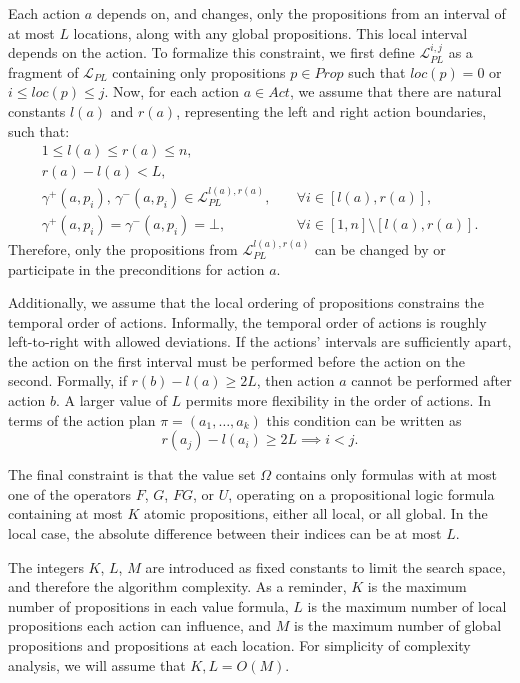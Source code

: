 \documentclass[]{jair}
\begin{document}
Each action $a$ depends on, and changes, only the propositions from an interval of at most $L$ locations,
along with any global propositions. This local interval depends on the action. 
To formalize this constraint, we first define $\mathcal{L}_{PL}^{i, j}$ as a fragment of $\mathcal{L}_{PL}$
containing only propositions $p\in Prop$ such that $loc(p)=0$ or $i\le loc(p)\le j$.
Now, for each action $a\in Act$, we assume that there are natural constants $l(a)$ and $r(a)$, representing the left and right action boundaries, such that: 
\begin{equation}
\begin{aligned}1\le l(a) \le r(a) \le n, \\ r(a)-l(a)< L,\\
\gamma^+(a, p_i),\,\gamma^-(a, p_i)\in \mathcal{L}_{PL}^{l(a), r(a)}, \quad & \forall i\in[l(a),r(a)],\\
\gamma^+(a, p_i)=\gamma^-(a, p_i)=\bot, \quad & \forall i\in [1,n]\setminus[l(a),r(a)].\end{aligned}\end{equation}
Therefore, only the propositions from $\mathcal{L}_{PL}^{l(a), r(a)}$ can be changed by or participate in the preconditions for action $a$.

Additionally, we assume that the local ordering of propositions constrains the temporal order of actions.
Informally, the temporal order of actions is roughly left-to-right with allowed deviations.
If the actions' intervals are sufficiently apart, the action on the first interval must be performed before the action on the second. Formally, if $r(b)-l(a)\ge 2L$, then action $a$ cannot be performed after action $b$.
A larger value of $L$ permits more flexibility in the order of actions.
In terms of the action plan $\pi = (a_1, \dots, a_k)$ this condition can be written as
\begin{equation}r(a_j)-l(a_i)\ge 2L \implies i<j.\label{k}\end{equation}

The final constraint is that the value set $\Omega$ contains only formulas with at most one of the operators
$F$, $G$, $FG$, or $U$, operating on a propositional logic formula containing at most $K$ atomic propositions, %
either all local, or all global. In the local case, the absolute difference between their indices can be at most $L$.

The integers $K$, $L$, $M$ are introduced as fixed constants to limit the search space,
and therefore the algorithm complexity. As a reminder,
$K$ is the maximum number of propositions in each value formula,
$L$ is the maximum number of local propositions each action can influence,
and $M$ is the maximum number of global propositions and propositions at each location.
For simplicity of complexity analysis, we will assume that $K, L= O(M)$.
\end{document}
